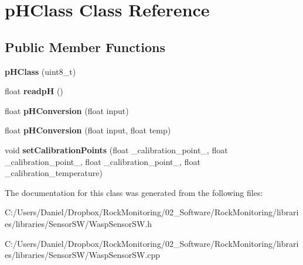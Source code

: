 \hypertarget{classp_h_class}{}\section{p\+H\+Class Class Reference}
\label{classp_h_class}
\subsection*{Public Member Functions}
\begin{DoxyCompactItemize}
\item 
{\bfseries p\+H\+Class} (uint8\+\_\+t)\hypertarget{classp_h_class_a9047f63884eb894092bcdfde9e971786}{}\label{classp_h_class_a9047f63884eb894092bcdfde9e971786}

\item 
float {\bfseries readpH} ()\hypertarget{classp_h_class_a60555a176d2cf713d237f8c8b8d98d48}{}\label{classp_h_class_a60555a176d2cf713d237f8c8b8d98d48}

\item 
float {\bfseries p\+H\+Conversion} (float input)\hypertarget{classp_h_class_ab4e0887f90277115fda7b7338aa1645e}{}\label{classp_h_class_ab4e0887f90277115fda7b7338aa1645e}

\item 
float {\bfseries p\+H\+Conversion} (float input, float temp)\hypertarget{classp_h_class_a066e78491187503fa7233e112b267752}{}\label{classp_h_class_a066e78491187503fa7233e112b267752}

\item 
void {\bfseries set\+Calibration\+Points} (float \+\_\+calibration\+\_\+point\+\_, float \+\_\+calibration\+\_\+point\+\_, float \+\_\+calibration\+\_\+point\+\_, float \+\_\+calibration\+\_\+temperature)\hypertarget{classp_h_class_a843ed1a94c8cbc6c848659c6e1f9904a}{}\label{classp_h_class_a843ed1a94c8cbc6c848659c6e1f9904a}

\end{DoxyCompactItemize}


The documentation for this class was generated from the following files\+:\begin{DoxyCompactItemize}
\item 
C\+:/\+Users/\+Daniel/\+Dropbox/\+Rock\+Monitoring/02\+\_\+\+Software/\+Rock\+Monitoring/libraries/libraries/\+Sensor\+S\+W/Wasp\+Sensor\+S\+W.\+h\item 
C\+:/\+Users/\+Daniel/\+Dropbox/\+Rock\+Monitoring/02\+\_\+\+Software/\+Rock\+Monitoring/libraries/libraries/\+Sensor\+S\+W/Wasp\+Sensor\+S\+W.\+cpp\end{DoxyCompactItemize}
